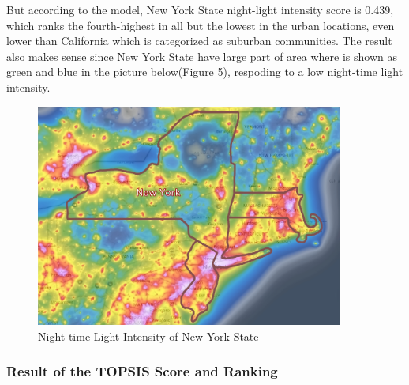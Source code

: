 But according to the model, New York State night-light intensity score is 0.439, which ranks the fourth-highest in all but the lowest in the urban locations, even lower than California which is categorized as suburban communities. The result also makes sense since New York State have large part of area where is shown as green and blue in the picture below(Figure 5), respoding to a low night-time light intensity.

\begin{figure}[H]\centering
    \includegraphics[width=0.9\textwidth]{figures/texted/New_York.jpg}
    \caption{Night-time Light Intensity of New York State} \label{fig:figure5}
\end{figure}

\subsubsection{Result of the TOPSIS Score and Ranking}

